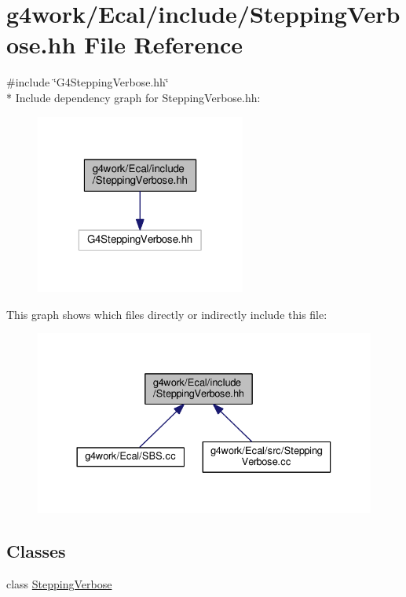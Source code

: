 \hypertarget{_stepping_verbose_8hh}{\section{g4work/\-Ecal/include/\-Stepping\-Verbose.hh File Reference}
\label{_stepping_verbose_8hh}
}
{\ttfamily \#include \char`\"{}G4\-Stepping\-Verbose.\-hh\char`\"{}}\\*
Include dependency graph for Stepping\-Verbose.\-hh\-:\nopagebreak
\begin{figure}[H]
\begin{center}
\leavevmode
\includegraphics[width=196pt]{_stepping_verbose_8hh__incl}
\end{center}
\end{figure}
This graph shows which files directly or indirectly include this file\-:\nopagebreak
\begin{figure}[H]
\begin{center}
\leavevmode
\includegraphics[width=333pt]{_stepping_verbose_8hh__dep__incl}
\end{center}
\end{figure}
\subsection*{Classes}
\begin{DoxyCompactItemize}
\item 
class \hyperlink{class_stepping_verbose}{Stepping\-Verbose}
\end{DoxyCompactItemize}
